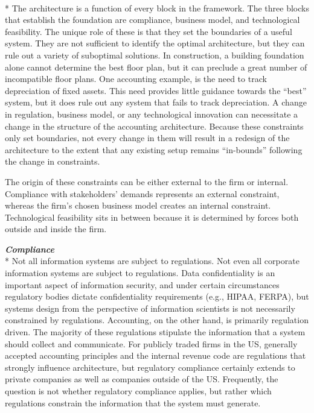\documentclass[12pt]{article}
\newcommand{\SubSection}[1]{\vspace{.15in}{\centering{}\normalsize{}\textbf{#1}}\\*\indent{}}
\newcommand{\SubSubSection}[1]{{\centering{}\normalsize{}\textbf{\emph{#1}}}\\*\indent{}}
\begin{document}
\SubSection{Foundation}
The architecture is a function of every block in the framework. The three blocks that establish the foundation are compliance, business model, and technological feasibility. The unique role of these is that they set the boundaries of a useful system. They are not sufficient to identify the optimal architecture, but they can rule out a variety of suboptimal solutions. In construction, a building foundation alone cannot determine the best floor plan, but it can preclude a great number of incompatible floor plans. One accounting example, is the need to track depreciation of fixed assets. This need provides little guidance towards the ``best'' system, but it does rule out any system that fails to track depreciation. A change in regulation, business model, or any technological innovation can necessitate a change in the structure of the accounting architecture. Because these constraints only set boundaries, not every change in them will result in a redesign of the architecture to the extent that any existing setup remains ``in-bounds'' following the change in constraints.

The origin of these constraints can be either external to the firm or internal. Compliance with stakeholders' demands represents an external constraint, whereas the firm's chosen business model creates an internal constraint. Technological feasibility sits in between because it is determined by forces both outside and inside the firm.

\SubSubSection{Compliance}
Not all information systems are subject to regulations. Not even all corporate information systems are subject to regulations. Data confidentiality is an important aspect of information security, and under certain circumstances regulatory bodies dictate confidentiality requirements (e.g., HIPAA, FERPA), but systems design from the perspective of information scientists is not necessarily constrained by regulations. Accounting, on the other hand, is primarily regulation driven. The majority of these regulations stipulate the information that a system should collect and communicate. For publicly traded firms in the US, generally accepted accounting principles and the internal revenue code are regulations that strongly influence architecture, but regulatory compliance certainly extends to private companies as well as companies outside of the US. Frequently, the question is not whether regulatory compliance applies, but rather which regulations constrain the information that the system must generate.
\end{document}
